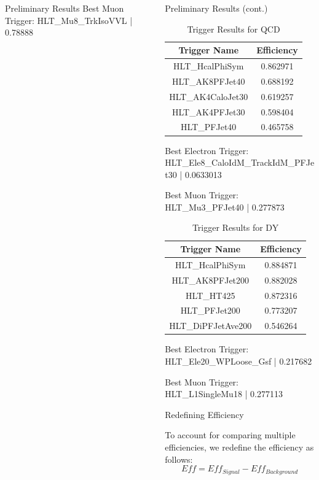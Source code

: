 \documentclass{beamer}
\newlength{\sepwidth}
\newlength{\colwidth}
\newcommand{\separatorcolumn}{\begin{column}{\sepwidth}\end{column}}
\begin{document}
\begin{frame}[t]
\begin{columns}[t]
\begin{column}{\colwidth}
\begin{block}{Preliminary Results}
    Best Muon Trigger: HLT\_Mu8\_TrkIsoVVL | 0.78888
  \end{block}

\end{column}

\separatorcolumn

\begin{column}{\colwidth}
  \begin{block}{Preliminary Results (cont.)}
    \begin{table}
      \caption{\label{table:2}Trigger Results for QCD}
          \begin{tabular}[t]{c|c}
              \hline
              \textbf{Trigger Name} & \textbf{Efficiency}\\
              \hline
              HLT\_HcalPhiSym & 0.862971\\
              HLT\_AK8PFJet40 & 0.688192 \\
              HLT\_AK4CaloJet30 & 0.619257 \\
              HLT\_AK4PFJet30 & 0.598404 \\
              HLT\_PFJet40 & 0.465758
          \end{tabular}
  \end{table}
  Best Electron Trigger: HLT\_Ele8\_CaloIdM\_TrackIdM\_PFJet30 | 0.0633013

Best Muon Trigger: HLT\_Mu3\_PFJet40 | 0.277873
\begin{table}[h!]
  \caption{\label{table:3}Trigger Results for DY}
      \begin{tabular}[t]{c|c}
          \hline
          \textbf{Trigger Name} & \textbf{Efficiency}\\
          \hline
          HLT\_HcalPhiSym & 0.884871\\
          HLT\_AK8PFJet200 & 0.882028 \\
          HLT\_HT425 & 0.872316 \\
          HLT\_PFJet200 & 0.773207 \\
          HLT\_DiPFJetAve200 & 0.546264
      \end{tabular}
\end{table}
Best Electron Trigger: HLT\_Ele20\_WPLoose\_Gsf | 0.217682

Best Muon Trigger: HLT\_L1SingleMu18 | 0.277113
  \end{block}
  \begin{block}{Redefining Efficiency}

    To account for comparing multiple efficiencies, we redefine the efficiency as follows:
    $$Eff = Eff_{Signal} - Eff_{Background}$$
  \end{block}


\end{column}
\end{columns}
\end{frame}
\end{document}
